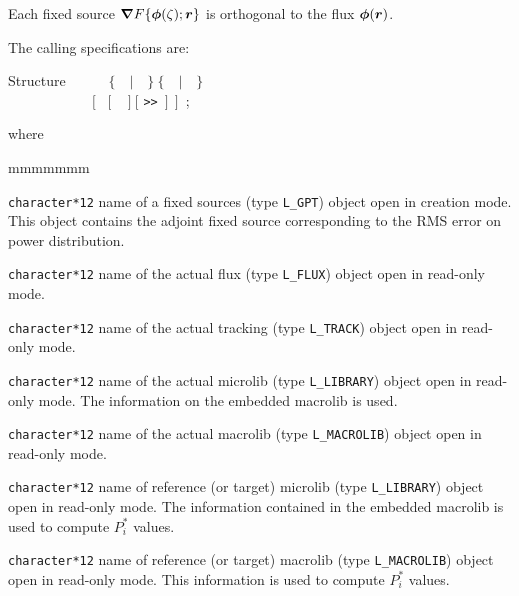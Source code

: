 \vskip 0.08cm

Each fixed source $\bff(\nabla)F\{\bff(\phi)(\zeta);\bff(r)\}$ is orthogonal to the flux $\bff(\phi)(\bff(r))$.

\vskip 0.08cm

The calling specifications are:

\begin{DataStructure}{Structure }
~\moc{:=}~~~~$~\{$~~$|$~~$\}~\{$~~$|$~~$\}$ \\
~~~~~~~~~~~~$[$ \moc{::}~$[$ ~ $]~[$  {\tt>>}~$]~~]$~;
\end{DataStructure}

\noindent where
\begin{ListeDeDescription}{mmmmmmm}

\item[\dusa{SOURCE}] {\tt character*12} name of a {\sc fixed sources} (type {\tt L\_GPT}) object open in creation
mode. This object contains the adjoint fixed source corresponding to the RMS error on power distribution.

\item[\dusa{FLUX}] {\tt character*12} name of the actual {\sc flux} (type {\tt L\_FLUX}) object open in read-only mode.

\item[\dusa{TRACK}] {\tt character*12} name of the actual {\sc tracking} (type {\tt L\_TRACK}) object open in read-only mode.

\item[\dusa{MICRO}] {\tt character*12} name of the actual {\sc microlib} (type {\tt L\_LIBRARY}) object open in read-only mode. The information on
the embedded macrolib is used.

\item[\dusa{MACRO}] {\tt character*12} name of the actual {\sc macrolib} (type {\tt L\_MACROLIB}) object open in read-only mode.

\item[\dusa{MICREF}] {\tt character*12} name of reference (or target) {\sc microlib} (type {\tt L\_LIBRARY}) object open in read-only mode. The
information contained in the embedded macrolib is used to compute $P^*_i$ values.

\item[\dusa{MACREF}] {\tt character*12} name of reference (or target) {\sc macrolib} (type {\tt L\_MACROLIB}) object open in read-only mode. This
information is used to compute $P^*_i$ values.


\end{ListeDeDescription}
